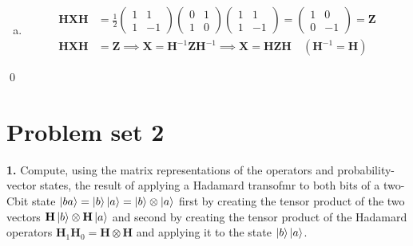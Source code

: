 \documentclass{book}
\theoremstyle{definition}
\newcommand{\X}{\mathbf{X}}
\newcommand{\f}[2]{\frac{#1}{#2}}
\newcommand{\had}{\mathbf{H}}
\begin{document}
\begin{enumerate}[(a)]
	\item 
	\begin{align}
	\had \X \had &= \f{1}{2}\begin{pmatrix}
	1&1\\1&-1
	\end{pmatrix}\begin{pmatrix}
	0&1\\1&0
	\end{pmatrix}\begin{pmatrix}
	1&1\\1&-1
	\end{pmatrix} = \begin{pmatrix}
	1&0\\0&-1
	\end{pmatrix} = \mathbf{Z}\\
	\had \X\had &= \mathbf{Z} \implies \X = \had^{-1}\mathbf{Z}\had^{-1}  \implies \X = \had \mathbf{Z} \had \quad (\had^{-1} = \had) 
	\end{align}
\end{enumerate}
\qed























\newpage



\section{Problem set 2}



\noindent \textbf{1.} Compute, using the matrix representations of the operators and probability-vector states, the result of applying a Hadamard transofmr to both bits of a two-Cbit state $\ket{ba} = \ket{b}\ket{a} = \ket{b}\otimes \ket{a}$ first by creating the tensor product of the two vectors $\had \ket{b}\otimes \had\ket{a}$ and second by creating the tensor product of the Hadamard operators $\had_1 \had_0 = \had \otimes \had$ and applying it to the state $\ket{b}\ket{a}$.\\
\end{document}
